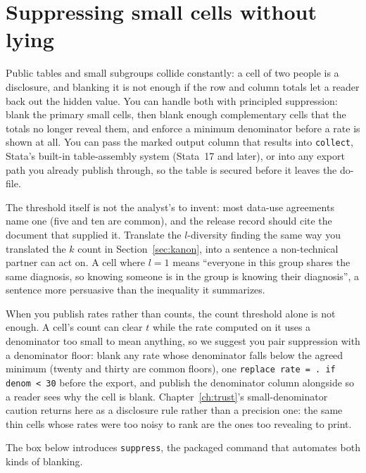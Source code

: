 \section{Suppressing small cells without lying}\label{sec:suppress}
Public tables and small subgroups collide constantly: a cell of two people is a disclosure, and blanking it is not enough if the row and column totals let a reader back out the hidden value. You can handle both with principled suppression: blank the primary small cells, then blank enough complementary cells that the totals no longer reveal them, and enforce a minimum denominator before a rate is shown at all. You can pass the marked output column that results into \texttt{collect}, Stata's built-in table-assembly system (Stata~17 and later), or into any export path you already publish through, so the table is secured before it leaves the do-file.

The threshold itself is not the analyst's to invent: most data-use agreements name one (five and ten are common), and the release record should cite the document that supplied it. Translate the $l$-diversity finding the same way you translated the $k$ count in Section~\ref{sec:kanon}, into a sentence a non-technical partner can act on. A cell where $l=1$ means \enquote{everyone in this group shares the same diagnosis, so knowing someone is in the group is knowing their diagnosis}, a sentence more persuasive than the inequality it summarizes.

When you publish rates rather than counts, the count threshold alone is not enough. A cell's count can clear $t$ while the rate computed on it uses a denominator too small to mean anything, so we suggest you pair suppression with a denominator floor: blank any rate whose denominator falls below the agreed minimum (twenty and thirty are common floors), one \texttt{replace rate = . if denom < 30} before the export, and publish the denominator column alongside so a reader sees why the cell is blank. Chapter~\ref{ch:trust}'s small-denominator caution returns here as a disclosure rule rather than a precision one: the same thin cells whose rates were too noisy to rank are the ones too revealing to print.

The box below introduces \texttt{suppress}, the packaged command that automates both kinds of blanking.

